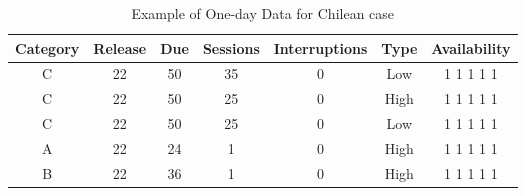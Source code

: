 \begin{table}[h]
\begin{tabular}{|c|c|c|c|c|c|c|}
\hline
Category & Release & Due & Sessions & Interruptions & Type & Availability \\ \hline
C        & 22      & 50  & 35       & 0    & Low        & 1 1 1 1 1 \\ \hline
C        & 22      & 50  & 25       & 0    & High       & 1 1 1 1 1 \\ \hline
C        & 22      & 50  & 25       & 0    & Low        & 1 1 1 1 1 \\ \hline
A        & 22      & 24  & 1        & 0    & High       & 1 1 1 1 1 \\ \hline
B        & 22      & 36  & 1        & 0    & High	& 1 1 1 1 1 \\ \hline
\end{tabular}
\caption{Example of One-day Data for Chilean case}\label{table-chile}
\end{table}